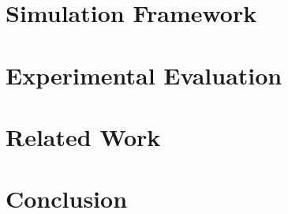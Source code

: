 \documentclass{udthesis}
\begin{document}
    \chapter{Simulation Framework}
        
    \chapter{Experimental Evaluation}
        
    \chapter{Related Work}
        
    \chapter{Conclusion}
        

    

   
   
\end{document}
